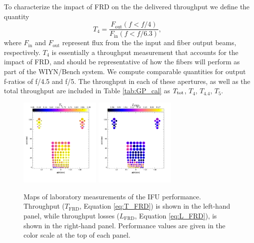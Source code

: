 \begin{appendices}
To characterize the impact of FRD on the the delivered throughput we
define the quantity
\begin{equation}
\label{eq:T_FRD}
  T_{\mathrm{4}} = \frac{F_{\mathrm{out}}(f<f/4)}{F_{\mathrm{in}}(f<f/6.3)},
\end{equation}
where $F_\mathrm{in}$ and $F_\mathrm{out}$ represent flux from the the
input and fiber output beams, respectively. $T_4$ is essentially a
throughput measurement that accounts for the impact of FRD, and should
be representative of how the fibers will perform as part of the
WIYN/Bench system.  We compute comparable quantities for output
f-ratios of f/4.5 and f/5.  The throughput in each of these apertures,
as well as the total throughput are included in Table \ref{tab:GP_cal}
as $T_{\rm tot}$, $T_4$, $T_{4.4}$, $T_{5}$.

\begin{figure}[htb]
  \centering
  \includegraphics[width=0.35\textwidth]{891_1/figs/gradpak_map.pdf}
  \includegraphics[width=0.35\textwidth]{891_1/figs/gradpak_L_map.pdf}
\vskip -0.25in
  \caption{\label{fig:TL_FRD} Maps of laboratory measurements of the
    \GP IFU performance. Throughput ($T_{\mathrm{FRD}}$, Equation
    \ref{eq:T_FRD}) is shown in the left-hand panel, while throughput
    losses ($L_{\mathrm{FRD}}$, Equation \ref{eq:L_FRD}), is shown in
    the right-hand panel. Performance values are given in the color
    scale at the top of each panel.}
\end{figure}


\end{appendices}
